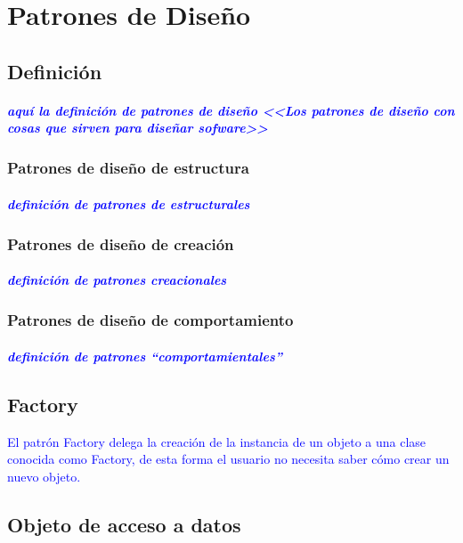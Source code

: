 \chapter{Patrones de Diseño}

\section{Definición}
\paragraph*{\textcolor{blue}{aquí la definición de patrones de diseño <<Los patrones de diseño con cosas que sirven para diseñar sofware>>}}
\subsection{Patrones de diseño de estructura}
\paragraph*{\textcolor{blue}{definición de patrones de estructurales}}
\subsection{Patrones de diseño de creación}
\paragraph*{\textcolor{blue}{definición de patrones creacionales}}
\subsection{Patrones de diseño de comportamiento}
\paragraph*{\textcolor{blue}{definición de patrones ``comportamientales''}}


\section{Factory}\label{sec-factory}
\textcolor{blue}{El patrón Factory delega la creación de la instancia de un objeto a una clase conocida como Factory, de esta forma el usuario no necesita saber cómo crear un nuevo objeto.}

\section{Objeto de acceso a datos}\label{sec-dao}

